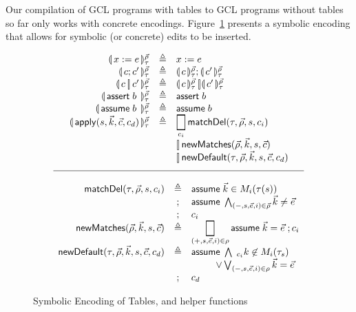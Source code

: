 Our compilation of GCL programs with tables to GCL programs without tables so
far only works with concrete encodings. Figure~\ref{fig:symbolic-encoding} presents a
symbolic encoding that allows for symbolic (or concrete) edits to be inserted.

\begin{figure}[ht]
  \[\begin{array}{r >{\triangleq}c l}
      \parenbb{x:=e}_\tau^{\vec\rho}
      && x:=e\\
      \parenbb{c;c'}_\tau^{\vec\rho}
      && \parenbb{c}_\tau^{\vec\rho};\parenbb{c'}_\tau^{\vec\rho} \\
      \parenbb{c \angel c'}_\tau^{\vec\rho}
      && \parenbb{c}_\tau^{\vec\rho} \angel \parenbb{c'}_\tau^{\vec\rho} \\
      \parenbb{\assert b}_\tau^{\vec\rho}
      && \assert b\\
      \parenbb{\assume b}_\tau^{\vec\rho}
      && \assume b\\
      \parenbb{\apply {s,\vec k, \vec c, c_d}}_\tau^{\vec\rho}
      && \displaystyle \Angel_{c_i}\mathsf{matchDel}(\tau, \vec\rho, s, c_i) \\
      \multicolumn 2 l {} & \angel \mathsf{newMatches}(\vec\rho, \vec k, s, \vec c) \\
      \multicolumn 2 l {} & \angel \mathsf{newDefault}(\tau, \vec\rho, \vec k,s, \vec c, c_d)\end{array}\]
  \[\begin{array}{r c l}
      \hline\\
      \mathsf{matchDel}(\tau,\vec\rho,s,c_i)
      &\triangleq
      &\assume{\vec k \in M_i(\tau(s))} \\
      &;&\assume{\bigwedge_{(-,s,\vec e, i) \in \vec \rho} \vec k \neq \vec e}\\
      &;&c_i \\
      \mathsf{newMatches}(\vec\rho, \vec k, s, \vec c)
      &\triangleq
      &\displaystyle \Angel_{(+,s,\vec e, i) \in \rho} \assume {\vec k = \vec e}; c_i \\
      \mathsf{newDefault}(\tau, \vec\rho,\vec k, s, \vec c, c_d) &\triangleq& \assume \bigwedge_{c_i}k\not\in M_i(\tau_s) \\
      && \qquad\;\;\vee \bigvee_{(-,s,\vec e, i) \in \rho} \vec k = \vec e\\
      &;& c_d
    \end{array}\]
  \caption{Symbolic Encoding of Tables, and helper functions}
  \label{fig:symbolic-encoding}

\end{figure}

